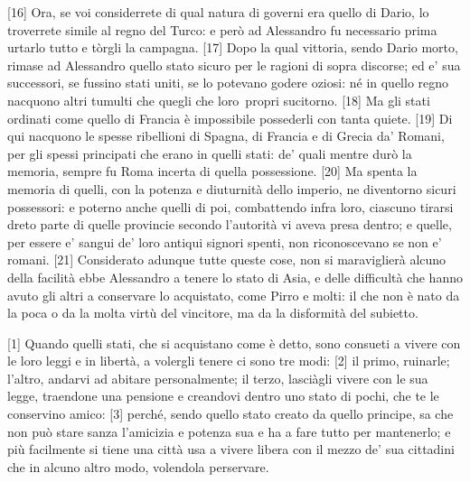 {[}16{]} Ora, se voi considerrete di qual natura di governi era quello
di Dario, lo troverrete simile al regno del Turco: e però ad Alessandro
fu necessario prima urtarlo tutto e tòrgli la campagna. {[}17{]} Dopo la
qual vittoria, sendo Dario morto, rimase ad Alessandro quello stato
sicuro per le ragioni di sopra discorse; ed e' sua successori, se
fussino stati uniti, se lo potevano godere oziosi: né in quello regno
nacquono altri tumulti che quegli che loro\est\ propri sucitorno. {[}18{]} Ma
gli stati ordinati come quello di Francia è impossibile possederli con
tanta quiete. {[}19{]} Di qui nacquono le spesse ribellioni di Spagna,
di Francia e di Grecia da' Romani, per gli spessi principati che erano
in quelli stati: de' quali mentre durò la memoria, sempre fu Roma
incerta di quella possessione. {[}20{]} Ma spenta la memoria di quelli,
con la potenza e diuturnità dello imperio, ne diventorno sicuri
possessori: e poterno anche quelli di poi, combattendo infra loro,
ciascuno tirarsi dreto parte di quelle provincie secondo l'autorità vi
aveva presa dentro; e quelle, per essere e' sangui de' loro antiqui
signori spenti, non riconoscevano se non e' romani. {[}21{]} Considerato
adunque tutte queste cose, non si maraviglierà alcuno della facilità
ebbe Alessandro a tenere lo stato di Asia, e delle difficultà che hanno
avuto gli altri a conservare lo acquistato, come Pirro e molti: il che
non è nato da la poca o da la molta virtù del vincitore, ma da la
disformità del subietto.


{[}1{]} Quando quelli stati, che si acquistano come è detto, sono
consueti a vivere con le loro leggi e in libertà, a volergli tenere ci
sono tre modi: {[}2{]} il primo, ruinarle; l'altro, andarvi ad abitare
personalmente; il terzo, lasciàgli vivere con le sua legge, traendone
una pensione e creandovi dentro uno stato di pochi, che te le conservino
amico: {[}3{]} perché, sendo quello stato creato da quello principe, sa
che non può stare sanza l'amicizia e potenza sua e ha a fare tutto per
mantenerlo; e più facilmente si tiene una città usa a vivere libera con
il mezzo de' sua cittadini che in alcuno altro modo, volendola
perservare.

